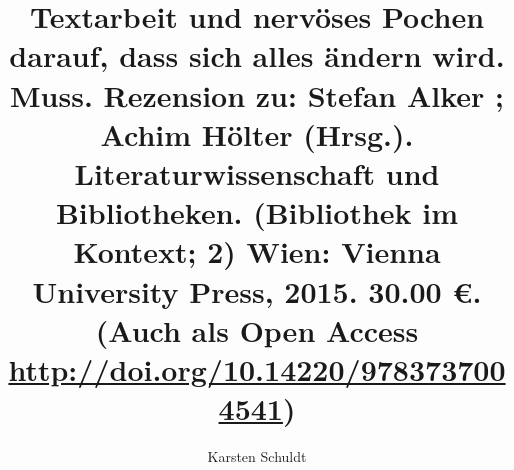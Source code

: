 

\fancyhead[R]{\thepage} %

\title{\LARGE{Textarbeit und nervöses Pochen darauf, dass sich alles ändern wird.
Muss. Rezension zu: Stefan Alker ; Achim Hölter (Hrsg.). Literaturwissenschaft
und Bibliotheken. (Bibliothek im Kontext; 2) Wien: Vienna University Press, 2015. 30.00 €. (Auch als Open Access \url{http://doi.org/10.14220/9783737004541})}} %
\author{Karsten Schuldt} %

\setcounter{page}{}